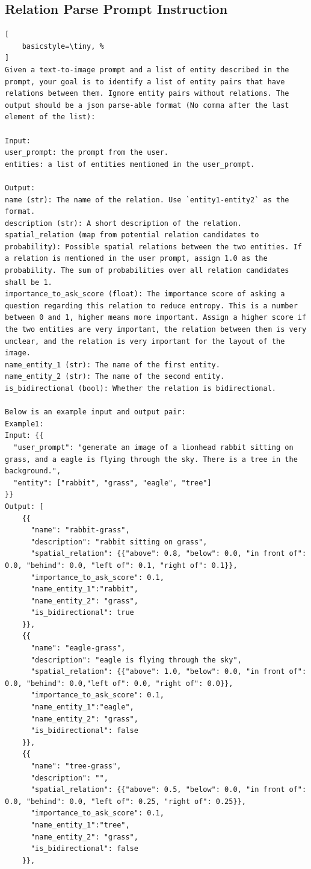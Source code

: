 \subsection{Relation Parse Prompt Instruction} \label{ssec:relation_parser}
\begin{lstlisting}[
    basicstyle=\tiny, %
]
Given a text-to-image prompt and a list of entity described in the prompt, your goal is to identify a list of entity pairs that have relations between them. Ignore entity pairs without relations. The output should be a json parse-able format (No comma after the last element of the list):

Input:
user_prompt: the prompt from the user.
entities: a list of entities mentioned in the user_prompt.

Output:
name (str): The name of the relation. Use `entity1-entity2` as the format.
description (str): A short description of the relation.
spatial_relation (map from potential relation candidates to probability): Possible spatial relations between the two entities. If a relation is mentioned in the user prompt, assign 1.0 as the probability. The sum of probabilities over all relation candidates shall be 1.
importance_to_ask_score (float): The importance score of asking a question regarding this relation to reduce entropy. This is a number between 0 and 1, higher means more important. Assign a higher score if the two entities are very important, the relation between them is very unclear, and the relation is very important for the layout of the image.
name_entity_1 (str): The name of the first entity.
name_entity_2 (str): The name of the second entity.
is_bidirectional (bool): Whether the relation is bidirectional.

Below is an example input and output pair:
Example1:
Input: {{
  "user_prompt": "generate an image of a lionhead rabbit sitting on grass, and a eagle is flying through the sky. There is a tree in the background.",
  "entity": ["rabbit", "grass", "eagle", "tree"]
}}
Output: [
    {{
      "name": "rabbit-grass",
      "description": "rabbit sitting on grass",
      "spatial_relation": {{"above": 0.8, "below": 0.0, "in front of": 0.0, "behind": 0.0, "left of": 0.1, "right of": 0.1}},
      "importance_to_ask_score": 0.1,
      "name_entity_1":"rabbit",
      "name_entity_2": "grass",
      "is_bidirectional": true
    }},
    {{
      "name": "eagle-grass",
      "description": "eagle is flying through the sky",
      "spatial_relation": {{"above": 1.0, "below": 0.0, "in front of": 0.0, "behind": 0.0,"left of": 0.0, "right of": 0.0}},
      "importance_to_ask_score": 0.1,
      "name_entity_1":"eagle",
      "name_entity_2": "grass",
      "is_bidirectional": false
    }},
    {{
      "name": "tree-grass",
      "description": "",
      "spatial_relation": {{"above": 0.5, "below": 0.0, "in front of": 0.0, "behind": 0.0, "left of": 0.25, "right of": 0.25}},
      "importance_to_ask_score": 0.1,
      "name_entity_1":"tree",
      "name_entity_2": "grass",
      "is_bidirectional": false
    }},


\end{lstlisting}
